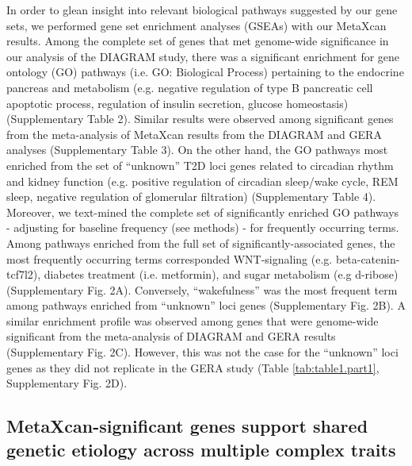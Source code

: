\documentclass[10pt]{article}
\begin{document}
In order to glean insight into relevant biological pathways suggested by our gene sets, we performed gene set enrichment analyses (GSEAs) with our MetaXcan results. Among the complete set of genes that met genome-wide significance in our analysis of the DIAGRAM study, there was a significant enrichment for gene ontology (GO) pathways (i.e. GO: Biological Process) pertaining to the endocrine pancreas and metabolism (e.g. negative regulation of type B pancreatic cell apoptotic process, regulation of insulin secretion, glucose homeostasis) (Supplementary Table 2). Similar results were observed among significant genes from the meta-analysis of MetaXcan results from the DIAGRAM and GERA analyses (Supplementary Table 3). On the other hand, the GO pathways most enriched from the set of  ``unknown'' T2D loci genes related to circadian rhythm and kidney function (e.g. positive regulation of circadian sleep/wake cycle, REM sleep, negative regulation of glomerular filtration) (Supplementary Table 4). Moreover, we text-mined the complete set of significantly enriched GO pathways - adjusting for baseline frequency (see methods) - for frequently occurring terms. Among pathways enriched from the full set of significantly-associated genes, the most frequently occurring terms corresponded WNT-signaling (e.g. beta-catenin-tcf7l2), diabetes treatment (i.e. metformin), and sugar metabolism (e.g d-ribose) (Supplementary Fig. 2A). Conversely,  ``wakefulness'' was the most frequent term among pathways enriched from ``unknown'' loci genes (Supplementary Fig. 2B). A similar enrichment profile was observed among genes that were genome-wide significant from the meta-analysis of DIAGRAM and GERA results (Supplementary Fig. 2C). However, this was not the case for the ``unknown'' loci genes as they did not replicate in the GERA study (Table \ref{tab:table1.part1}, Supplementary Fig. 2D). 

\subsection*{MetaXcan-significant genes support shared genetic etiology across multiple complex traits}
\end{document}
